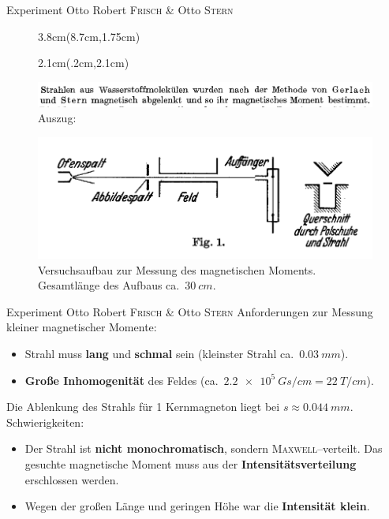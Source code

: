 \documentclass[t,9pt]{beamer}
\newcommand{\highlight}[3]{ \begin{textblock*}{#1}(#2,#3) \begin{tcolorbox} [enhanced,opacityfill=.1,colback=blue] \end{tcolorbox} \end{textblock*} } %
\begin{document}
        \begin{frame}{Experiment Otto Robert \textsc{Frisch} \& Otto \textsc{Stern}} 
                \begin{figure}
                        \highlight{3.8cm}{8.7cm}{1.75cm}
                        \highlight{2.1cm}{.2cm}{2.1cm}
                        \includegraphics[width=\textwidth]{prosi_nach_methode_stern_gerlach.png}
                        \caption{Auszug:\cite{FrischStern1933}}
                \end{figure} 
                \begin{figure}
                        \includegraphics[width=.8\textwidth]{prosi_versuchsaufbau_mag_moment.png}
                        \caption{Versuchsaufbau zur Messung des magnetischen Moments. Gesamtlänge des Aufbaus ca.\ $\SI{30}{cm}$.\cite{FrischStern1933}}
                \end{figure}
        \end{frame}

        \begin{frame}{Experiment Otto Robert \textsc{Frisch} \& Otto \textsc{Stern}}
                Anforderungen zur Messung kleiner magnetischer Momente:\\
                \begin{itemize}
                        \item Strahl muss \textbf{lang} und \textbf{schmal} sein (kleinster Strahl ca.\ $\SI{0.03}{mm}$).
                        \item \textbf{Große Inhomogenität} des Feldes (ca.\ $\SI{2.2e+5}{Gs/cm}=\SI{22}{T/cm}$).
                \end{itemize}
                \pause
                \vspace{.5cm} Die Ablenkung des Strahls für 1 Kernmagneton liegt bei $s\approx \SI{0.044}{mm}$.
                \pause
                \\\vspace{.5cm}Schwierigkeiten:
                \begin{itemize}
                        \item Der Strahl ist \textbf{nicht monochromatisch}, sondern \textsc{Maxwell}--verteilt. Das gesuchte magnetische Moment muss aus der \textbf{Intensitätsverteilung} erschlossen werden.
                        \item Wegen der großen Länge und geringen Höhe war die \textbf{Intensität klein}.
                \end{itemize}
                \cite{FrischStern1933}
        \end{frame}
\end{document}

